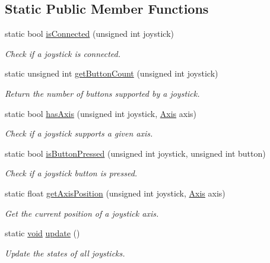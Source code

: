 \subsection*{Static Public Member Functions}
\begin{DoxyCompactItemize}
\item 
static bool \hyperlink{classsf_1_1_joystick_ac7d4e1923e9f9420174f26703ea63d6c}{is\-Connected} (unsigned int joystick)
\begin{DoxyCompactList}\small\item\em Check if a joystick is connected. \end{DoxyCompactList}\item 
static unsigned int \hyperlink{classsf_1_1_joystick_a4de9f445c6582bfe9f0873f695682885}{get\-Button\-Count} (unsigned int joystick)
\begin{DoxyCompactList}\small\item\em Return the number of buttons supported by a joystick. \end{DoxyCompactList}\item 
static bool \hyperlink{classsf_1_1_joystick_a268e8f2a11ae6af4a47c727cb4ab4d95}{has\-Axis} (unsigned int joystick, \hyperlink{classsf_1_1_joystick_a48db337092c2e263774f94de6d50baa7}{Axis} axis)
\begin{DoxyCompactList}\small\item\em Check if a joystick supports a given axis. \end{DoxyCompactList}\item 
static bool \hyperlink{classsf_1_1_joystick_ae0d97a4b84268cbe6a7078e1b2717835}{is\-Button\-Pressed} (unsigned int joystick, unsigned int button)
\begin{DoxyCompactList}\small\item\em Check if a joystick button is pressed. \end{DoxyCompactList}\item 
static float \hyperlink{classsf_1_1_joystick_aea4930193331df1851b709f3060ba58b}{get\-Axis\-Position} (unsigned int joystick, \hyperlink{classsf_1_1_joystick_a48db337092c2e263774f94de6d50baa7}{Axis} axis)
\begin{DoxyCompactList}\small\item\em Get the current position of a joystick axis. \end{DoxyCompactList}\item 
static \hyperlink{glutf90_8h_ac778d6f63f1aaf8ebda0ce6ac821b56e}{void} \hyperlink{classsf_1_1_joystick_ab85fa9175b4edd3e5a07ee3cde0b0f48}{update} ()
\begin{DoxyCompactList}\small\item\em Update the states of all joysticks. \end{DoxyCompactList}\end{DoxyCompactItemize}


